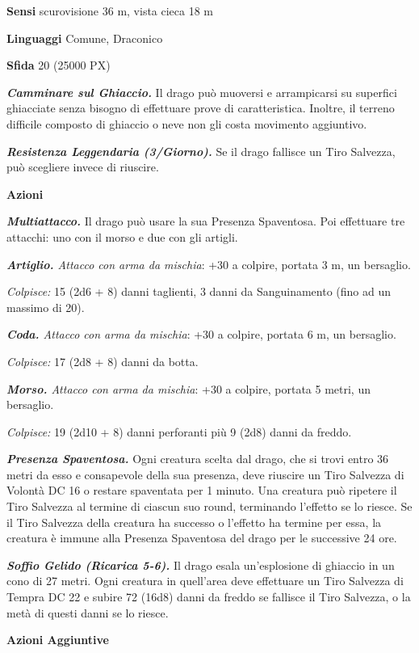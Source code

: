\begin{multicols}{2}
\textbf{Sensi} scurovisione 36 m, vista cieca 18 m

\textbf{Linguaggi} Comune, Draconico

\textbf{Sfida} 20 (25000 PX)

\textit{\textbf{Camminare sul Ghiaccio.}} Il drago può muoversi e arrampicarsi su superfici ghiacciate senza bisogno di effettuare prove di caratteristica. Inoltre, il terreno difficile composto di ghiaccio o neve non gli costa movimento aggiuntivo.

\textit{\textbf{Resistenza Leggendaria (3/Giorno).}} Se il drago fallisce un Tiro Salvezza, può scegliere invece di riuscire.

\textbf{Azioni}

\textit{\textbf{Multiattacco.}} Il drago può usare la sua Presenza Spaventosa. Poi effettuare tre attacchi: uno con il morso e due con gli artigli.

\textit{\textbf{Artiglio.} Attacco con arma da mischia}: +30 a colpire, portata 3 m, un bersaglio.

\textit{Colpisce:} 15 (2d6 + 8) danni taglienti, 3 danni da Sanguinamento (fino ad un massimo di 20).

\textit{\textbf{Coda.} Attacco con arma da mischia}: +30 a colpire, portata 6 m, un bersaglio.

\textit{Colpisce:} 17 (2d8 + 8) danni da botta.

\textit{\textbf{Morso.} Attacco con arma da mischia}: +30 a colpire, portata 5 metri, un bersaglio.

\textit{Colpisce:} 19 (2d10 + 8) danni perforanti più 9 (2d8) danni da freddo.

\textit{\textbf{Presenza Spaventosa.}} Ogni creatura scelta dal drago, che si trovi entro 36 metri da esso e consapevole della sua presenza, deve riuscire un Tiro Salvezza di Volontà DC 16 o restare spaventata per 1 minuto. Una creatura può ripetere il Tiro Salvezza al termine di ciascun suo round, terminando l'effetto se lo riesce. Se il Tiro Salvezza della creatura ha successo o l'effetto ha termine per essa, la creatura è immune alla Presenza Spaventosa del drago per le successive 24 ore.

\textit{\textbf{Soffio Gelido (Ricarica 5-6).}} Il drago esala un'esplosione di ghiaccio in un cono di 27 metri. Ogni creatura in quell'area deve effettuare un Tiro Salvezza di Tempra DC 22 e subire 72 (16d8) danni da freddo se fallisce il Tiro Salvezza, o la metà di questi danni se lo riesce.

\textbf{Azioni Aggiuntive}


\end{multicols}
